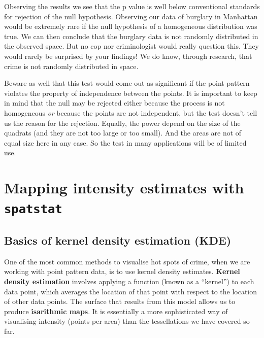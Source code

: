 \documentclass[
  krantz2]{krantz}
\begin{document}
Observing the results we see that the p value is well below conventional standards for rejection of the null hypothesis. Observing our data of burglary in Manhattan would be extremely rare if the null hypothesis of a homogeneous distribution was true. We can then conclude that the burglary data is not randomly distributed in the observed space. But no cop nor criminologist would really question this. They would rarely be surprised by your findings! We do know, through research, that crime is not randomly distributed in space.

Beware as well that this test would come out as significant if the point pattern violates the property of independence between the points. It is important to keep in mind that the null may be rejected either because the process is not homogeneous \emph{or} because the points are not independent, but the test doesn't tell us the reason for the rejection. Equally, the power depend on the size of the quadrats (and they are not too large or too small). And the areas are not of equal size here in any case. So the test in many applications will be of limited use.

\hypertarget{mapping-intensity-estimates-with-spatstat}{%
\section{\texorpdfstring{Mapping intensity estimates with \texttt{spatstat}}{Mapping intensity estimates with spatstat}}\label{mapping-intensity-estimates-with-spatstat}}

\hypertarget{basics-of-kernel-density-estimation-kde}{%
\subsection{Basics of kernel density estimation (KDE)}\label{basics-of-kernel-density-estimation-kde}}

One of the most common methods to visualise hot spots of crime, when we are working with point pattern data, is to use kernel density estimates. \textbf{Kernel density estimation} involves applying a function (known as a ``kernel'') to each data point, which averages the location of that point with respect to the location of other data points. The surface that results from this model allows us to produce \textbf{isarithmic maps}. It is essentially a more sophisticated way of visualising intensity (points per area) than the tessellations we have covered so far.
\end{document}
